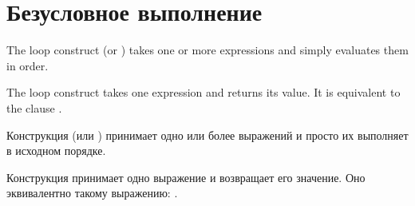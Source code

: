 \section{Безусловное выполнение}
\label{LOOP-UNCOND-SECTION}

The loop construct  (or ) takes one or more expressions
and simply evaluates them in order.

The loop construct  takes one expression and returns its value.  It 
is equivalent to the clause .

Конструкция  (или ) принимает одно или более
выражений и просто их выполняет в исходном порядке.

Конструкция  принимает одно выражение и возвращает его
значение. Оно эквивалентно такому выражению: .

